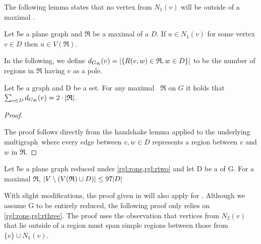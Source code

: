 

\noindent The following lemma states that no vertex from $N_1(v)$ will be outside of a maximal \dreg.

\begin{lemma}\label{lemma:noneinside}
    \cite[Lemma 6]{Alber2004}
    Let \G be a plane graph and $\mathfrak{R}$ be a maximal \dreg of a \dom $D$. If $u \in N_1(v)$ for some vertex $v \in D$ then $u \in V(\mathfrak{R})$.
    
\end{lemma}
In the following, we define $d_{G_{\mathfrak{R}}}(v) = \abs{\{R(v,w) \in \mathfrak{R}, w \in D\}}$ to be the number of regions in $\mathfrak{R}$ having $v$ as a pole. 

\begin{corollary}
    Let \G be a graph and D be a set. For any maximal \dreg~$\mathfrak{R}$ on $G$ it holds that $\sum_{v \in D} d_{G_{\mathfrak{R}}}(v) = 2 \cdot \abs{\mathfrak{R}}$.
\end{corollary}
\begin{proof}\label{lemma:polesBound}
    
    The proof follows directly from the handshake lemma applied to the underlying multigraph~\GR where every edge between $v,w \in D$ represents a region between $v$ and $w$ in $\mathfrak{R}$.
\end{proof}

\begin{proposition}\label{lemma:outside}
    Let \G be a plane graph reduced under \cref*{rgl:rone,rgl:rtwo} and let D be a \sdom of G. For a maximal \dreg $\mathfrak{R}$,  $\abs{V \setminus (V(\mathfrak{R}) \cup D)} \leq 97 \abs{D}$
\end{proposition}

With slight modifications, the proof given in \cite[Revision 2014]{Garnero2018} will also apply for \sdom. Although we assume G to be entirely reduced, the following proof only relies on \cref{rgl:rone,rgl:rthree}. The proof uses the observation that vertices from $N_2(v)$ that lie outside of a region must span simple regions between those from $\{v\} \cup N_1(v)$.


